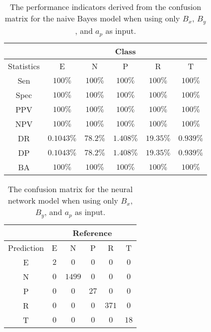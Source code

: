 \begin{table}[!ht]
	\centering
	\begin{tabular}{|c|c|c|c|c|c|}
		\hline
		 & \multicolumn{5}{c|}{Class} \\ \hline
		Statistics & E & N & P & R & T \\ \hline
		Sen & $100\%$ & $100\%$ & $100\%$ & $100\%$ & $100\%$ \\ \hline
		Spec & $100\%$ & $100\%$ & $100\%$ & $100\%$ & $100\%$ \\ \hline
		PPV & $100\%$ & $100\%$ & $100\%$ & $100\%$ & $100\%$ \\ \hline
		NPV & $100\%$ & $100\%$ & $100\%$ & $100\%$ & $100\%$ \\ \hline
		DR & $0.1043\%$ & $78.2\%$ & $1.408\%$ & $19.35\%$ & $0.939\%$ \\ \hline
		DP & $0.1043\%$ & $78.2\%$ & $1.408\%$ & $19.35\%$ & $0.939\%$ \\ \hline
		BA & $100\%$ & $100\%$ & $100\%$ & $100\%$ & $100\%$ \\ \hline
	\end{tabular}
	\caption{The performance indicators derived from the confusion matrix for the naive Bayes model when using only $B_{x}$, $B_{y}$, and $a_{p}$ as input.}
	\label{tab:cs:reverse:xyap:nb}
\end{table}

\begin{table}[!ht]
	\centering
	\begin{tabular}{|c|c|c|c|c|c|}
		\hline
		 & \multicolumn{5}{|c|}{Reference} \\ \hline
		 Prediction & E & N & P & R & T \\ \hline
		 E & $2$ & $0$ & $0$ & $0$ & $0$ \\ \hline
		 N & $0$ & $1499$ & $0$ & $0$ & $0$ \\ \hline
		 P & $0$ & $0$ & $27$ & $0$ & $0$ \\ \hline
		 R & $0$ & $0$ & $0$ & $371$ & $0$ \\ \hline
		 T & $0$ & $0$ & $0$ & $0$ & $18$ \\ \hline
	\end{tabular}
	\caption{The confusion matrix for the neural network model when using only $B_{x}$, $B_{y}$, and $a_{p}$ as input.}
	\label{tab:cm:xyap:nnet}
\end{table}

